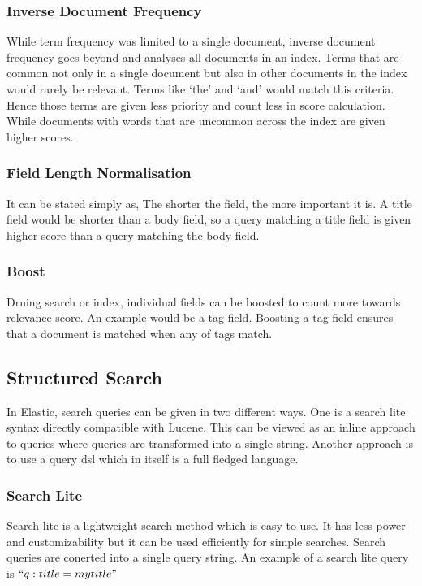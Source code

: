 \documentclass[12pt]{article}
\begin{document}
			\subsubsection{Inverse Document Frequency}
				While term frequency was limited to a single document, inverse document frequency goes beyond and analyses all documents in an index. Terms that are common not only in a single document but also in other documents in the index would rarely be relevant. Terms like `the' and `and' would match this criteria. Hence those terms are given less priority and count less in score calculation. While documents with words that are uncommon across the index are given higher scores.

			\subsubsection{Field Length Normalisation}
				It can be stated simply as, The shorter the field, the more important it is. A title field would be shorter than a body field, so a query matching a title field is given higher score than a query matching the body field. 

			\subsubsection{Boost}
				Druing search or index, individual fields can be boosted to count more towards relevance score. An example would be a tag field. Boosting a tag field ensures that a document is matched when any of tags match. 

		\subsection{Structured Search}
			In Elastic, search queries can be given in two different ways. One is a search lite syntax directly compatible with Lucene. This can be viewed as an inline approach to queries where queries are transformed into a single string. Another approach is to use a query \ac{dsl} which in itself is a full fledged language.

			\subsubsection{Search Lite}
				Search lite is a lightweight search method which is easy to use. It has less power and customizability but it can be used efficiently for simple searches. Search queries are conerted into a single query string. An example of a search lite query is \(``q:title=my title"\)
\end{document}

